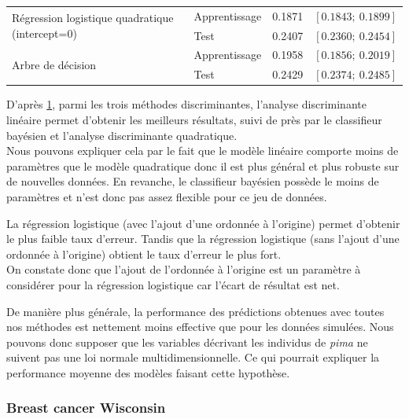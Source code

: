 \documentclass{article}
\begin{document}
\begin{table}[H]
\begin{tabular}{l|l|cc}
\multirow{2}{*}{Régression logistique quadratique (intercept=0)}                  & Apprentissage    & 0.1871                             & $\left[0.1843 ;~ 0.1899 \right]$  \\
                                       & Test             & 0.2407                                 & $\left[0.2360 ;~ 0.2454 \right]$ \\ \hline                                       
\multirow{2}{*}{Arbre de décision}                  & Apprentissage    & 0.1958                             & $\left[0.1856 ;~ 0.2019 \right]$  \\
                                       & Test             & 0.2429                                 & $\left[0.2374 ;~ 0.2485 \right]$ 
\end{tabular}


\label{err_pima}
\end{table}

D'après \ref{err_pima}, parmi les trois méthodes discriminantes, l'analyse discriminante linéaire permet d'obtenir les meilleurs résultats, suivi de près par le classifieur bayésien et l'analyse discriminante quadratique.\\
Nous pouvons expliquer cela par le fait que le modèle linéaire comporte moins de paramètres que le modèle quadratique donc il est plus général et plus robuste sur de nouvelles données. En revanche, le classifieur bayésien possède le moins de paramètres et n'est donc pas assez flexible pour ce jeu de données.

La régression logistique (avec l'ajout d'une ordonnée à l'origine) permet d'obtenir le plus faible taux d'erreur. Tandis que la régression logistique (sans l'ajout d'une ordonnée à l'origine) obtient le taux d'erreur le plus fort.\\
On constate donc que l'ajout de l'ordonnée à l'origine est un paramètre à considérer pour la régression logistique car l'écart de résultat est net.

De manière plus générale, la performance des prédictions obtenues avec toutes nos méthodes est nettement moins effective que pour les données simulées. Nous pouvons donc supposer que les variables décrivant les individus de \textit{pima} ne suivent pas une loi normale multidimensionnelle. Ce qui pourrait expliquer la performance moyenne des modèles faisant cette hypothèse.


\subsubsection{Breast cancer Wisconsin}
\end{document}
